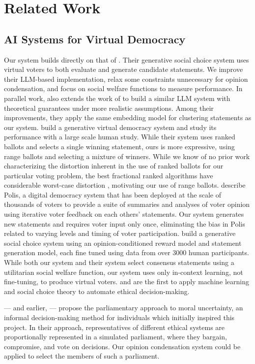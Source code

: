 \documentclass[11pt]{article}
\begin{document}
\section{Related Work}
\subsection{AI Systems for Virtual Democracy}
Our system builds directly on that of \citet{fish-v2}. Their generative social choice system uses virtual voters to both evaluate and generate candidate statements. We improve their LLM-based implementation, relax some constraints unnecessary for opinion condensation, and focus on social welfare functions to measure performance. In parallel work, \citet{gsc-next-gen} also extends the work of \citet{fish-v2} to build a similar LLM system with theoretical guarantees under more realistic assumptions. Among their improvements, they apply the same embedding model for clustering statements as our system. \citet{habermas-machine} build a generative virtual democracy system and study its performance with a large scale human study. While their system uses ranked ballots and selects a single winning statement, ours is more expressive, using range ballots and selecting a mixture of winners. While we know of no prior work characterizing the distortion inherent in the use of ranked ballots for our particular voting problem, the best fractional ranked algorithms have considerable worst-case distortion \citep{anshelevich-2017}, motivating our use of range ballots. \citet{polis} describe Polis, a digital democracy system that has been deployed at the scale of thousands of voters to provide a suite of summaries and analyses of voter opinion using iterative voter feedback on each others’ statements. Our system generates new statements and requires voter input only once, eliminating the bias in Polis related to varying levels and timing of voter participation. \citet{bakker-consensus} build a generative social choice system using an opinion-conditioned reward model and statement generation model, each fine tuned using data from over 3000 human participants. While both our system and their system select consensus statements using a utilitarian social welfare function, our system uses only in-context learning, not fine-tuning, to produce virtual voters. \citet{noothigattu-2018} and \citet{freedman-kidney-exchange} are the first to apply machine learning and social choice theory to automate ethical decision-making.

\citet{newberry-moral-parliaments} — and earlier, \citet{bostrom-moral-parliaments-2009} — propose the parliamentary approach to moral uncertainty, an informal decision-making method for individuals which initially inspired this project. In their approach, representatives of different ethical systems are proportionally represented in a simulated parliament, where they bargain, compromise, and vote on decisions. Our opinion condensation system could be applied to select the members of such a parliament.
\end{document}
